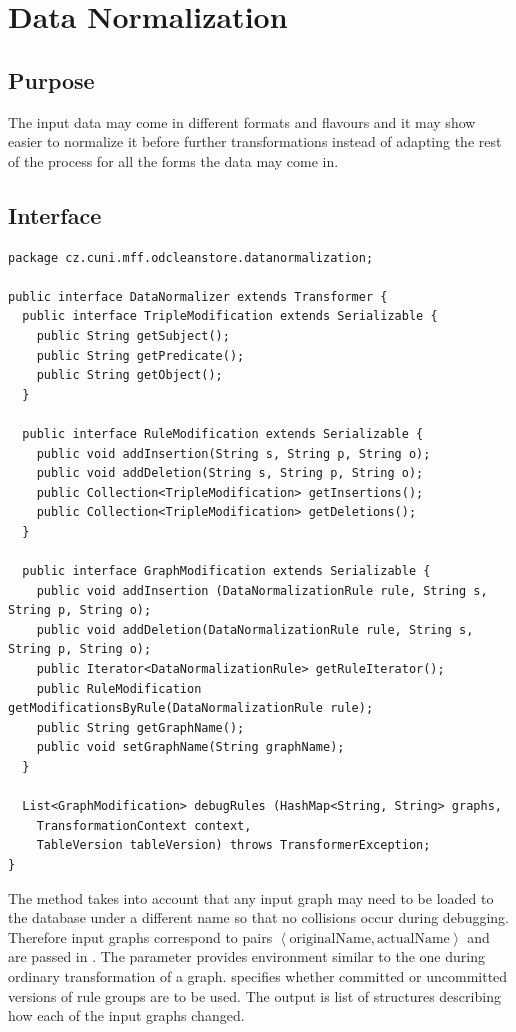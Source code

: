 \section{Data Normalization}

\subsection{Purpose}

The input data may come in different formats and flavours and it may show easier to normalize it before further transformations instead of adapting the rest of the process for all the forms the data may come in.

\subsection{Interface}

\begin{lstlisting}[caption=Data Normalizer interface,label=lst:dataNormalizer]
package cz.cuni.mff.odcleanstore.datanormalization;

public interface DataNormalizer extends Transformer {
  public interface TripleModification extends Serializable {
    public String getSubject();
    public String getPredicate();
    public String getObject();
  }

  public interface RuleModification extends Serializable {
    public void addInsertion(String s, String p, String o);
    public void addDeletion(String s, String p, String o);
    public Collection<TripleModification> getInsertions();
    public Collection<TripleModification> getDeletions();
  }

  public interface GraphModification extends Serializable {
    public void addInsertion (DataNormalizationRule rule, String s, String p, String o);
    public void addDeletion(DataNormalizationRule rule, String s, String p, String o);
    public Iterator<DataNormalizationRule> getRuleIterator();
    public RuleModification getModificationsByRule(DataNormalizationRule rule);
    public String getGraphName();
    public void setGraphName(String graphName);
  }

  List<GraphModification> debugRules (HashMap<String, String> graphs,
    TransformationContext context,
    TableVersion tableVersion) throws TransformerException;
}
\end{lstlisting}

The method  takes into account that any input graph may need to be loaded to the database under a different name so that no collisions occur during debugging. Therefore input graphs correspond to pairs $ \left< \text{originalName}, \text{actualName} \right> $ and are passed in . The  parameter provides environment similar to the one during ordinary transformation of a graph.  specifies whether committed or uncommitted versions of rule groups are to be used. The output is list of  structures describing how each of the input graphs changed.

